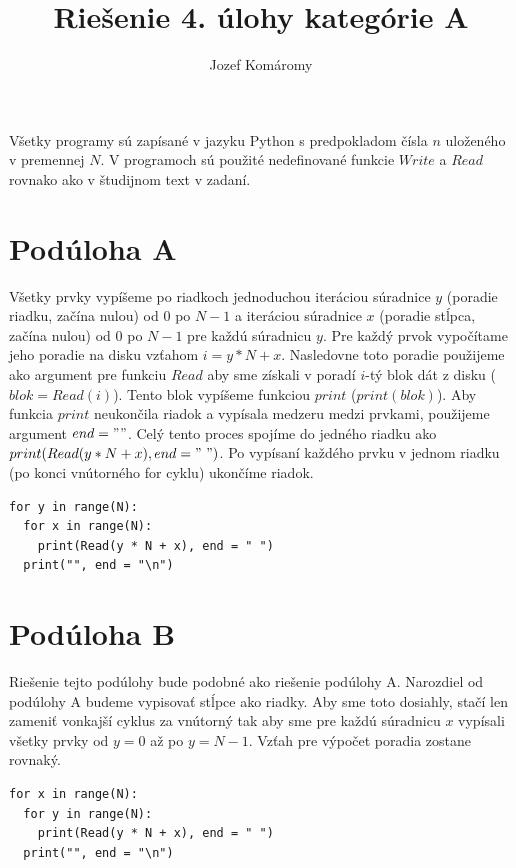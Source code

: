 \documentclass{article}
\begin{document}
\title{Riešenie 4. úlohy kategórie A}
\author{Jozef Komáromy}

\maketitle

Všetky programy sú zapísané v jazyku Python s predpokladom čísla $n$ uloženého v premennej $N$. V programoch sú použité nedefinované funkcie $Write$ a $Read$ rovnako ako v študijnom text v zadaní.

\section*{Podúloha A}

Všetky prvky vypíšeme po riadkoch jednoduchou iteráciou súradnice $y$ (poradie riadku, začína nulou) od $0$ po $N-1$ a iteráciou súradnice $x$ (poradie stĺpca, začína nulou) od $0$ po $N-1$ pre každú súradnicu $y$. Pre každý prvok vypočítame jeho poradie na disku vzťahom $i = y * N + x$. Nasledovne toto poradie použijeme ako argument pre funkciu $Read$ aby sme získali v poradí $i$-tý blok dát z disku ($blok = Read(i)$). Tento blok vypíšeme funkciou $print$ (\(print(blok)\)). Aby funkcia $print$ neukončila riadok a vypísala medzeru medzi prvkami, použijeme argument \(end = " "\). Celý tento proces spojíme do jedného riadku ako \(print(Read(y * N + x), end = "\ ")\). Po vypísaní každého prvku v jednom riadku (po konci vnútorného for cyklu) ukončíme riadok.

\begin{verbatim}
for y in range(N):
  for x in range(N):
    print(Read(y * N + x), end = " ")
  print("", end = "\n")
\end{verbatim}

\section*{Podúloha B}

Riešenie tejto podúlohy bude podobné ako riešenie podúlohy A. Narozdiel od podúlohy A budeme vypisovať stĺpce ako riadky. Aby sme toto dosiahly, stačí len zameniť vonkajší cyklus za vnútorný tak aby sme pre každú súradnicu $x$ vypísali všetky prvky od $y = 0$ až po $y = N-1$. Vzťah pre výpočet poradia zostane rovnaký.

\begin{verbatim}
for x in range(N):
  for y in range(N):
    print(Read(y * N + x), end = " ")
  print("", end = "\n")
\end{verbatim}
\end{document}
